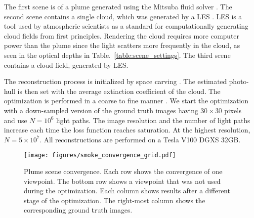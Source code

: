 \documentclass{article}
\begin{document}
The first scene is of a plume generated using the Mitsuba fluid solver \citep{Mitsuba}. The second scene contains a single cloud, which was generated by a \ac{LES} \citep{chung2014large}. \ac{LES} is a tool used by atmospheric scientists as a standard for computationally generating cloud fields from first principles. Rendering the cloud requires more computer power than the plume since the light scatters more frequently in the cloud, as seen in the optical depths in Table.~\ref{table:scene_settings}. The third scene contains a cloud field, generated by \ac{LES}. 

The reconstruction process is initialized by space carving \citep{kutulakos2000theory}. The estimated photo-hull is then set with the average extinction coefficient of the cloud. The optimization is performed in a coarse to fine manner \citep{loeub2020monotonicity}. We start the optimization with a down-sampled version of the ground truth images having $30\times30$ pixels and use $N=10^6$ light paths. The image resolution and the number of light paths increase each time the loss function reaches saturation. At the highest resolution, $N=5\times10^7$. All reconstructions are performed on a Tesla V100 DGXS 32GB.



\begin{figure}[t]
  \centering
   \texttt{[image: figures/smoke\_convergence\_grid.pdf]} 
    \caption{Plume scene convergence. Each row shows the convergence of one viewpoint. The bottom row shows a viewpoint that was not used during the optimization. Each column shows results after a different stage of the optimization. The right-most column shows the corresponding ground truth images. }
    \label{fig:smoke_convergence_grid}
\end{figure} 



\end{document}
